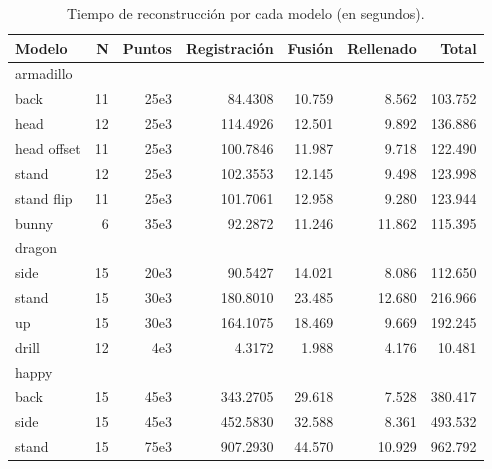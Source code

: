 \begin{table}
	\centering
	\begin{tabular}{l*{6}{r}}
		\toprule
		Modelo                 & N    & Puntos      &  Registración & Fusión   & Rellenado & Total\\
		\midrule                      
		armadillo\\
		{\Em}back         &   11 &  25e3         &   84.4308        & 10.759  &  8.562  & 103.752\\
		{\Em}head         &   12 &  25e3         &   114.4926       & 12.501  &  9.892  & 136.886\\
		{\Em}head offset  &   11 &  25e3         &   100.7846       & 11.987  &  9.718  & 122.490\\
		{\Em}stand        &   12 &  25e3         &   102.3553       & 12.145  &  9.498  & 123.998\\
		{\Em}stand flip   &   11 &  25e3         &   101.7061       & 12.958  &  9.280  & 123.944\\
		\midrule                      
		bunny                  &   6  &  35e3         &    92.2872       & 11.246  &  11.862 & 115.395\\
		\midrule                      
		dragon\\
		{\Em}side            &   15 &  20e3         &   90.5427        & 14.021  &  8.086  & 112.650\\
		{\Em}stand           &   15 &  30e3         &   180.8010       & 23.485  &  12.680 & 216.966\\
		{\Em}up              &   15 &  30e3         &   164.1075       & 18.469  &  9.669  & 192.245\\
		\midrule                      
		drill                  &   12 &   4e3         &   4.3172         & 1.988   &  4.176  & 10.481 \\
		\midrule                      
		happy\\
		{\Em}back             &   15 &  45e3         &   343.2705       & 29.618  &  7.528  & 380.417\\
		{\Em}side             &   15 &  45e3         &   452.5830       & 32.588  &  8.361  & 493.532\\
		{\Em}stand            &   15 &  75e3         &   907.2930       & 44.570  &  10.929 & 962.792\\
		\bottomrule
	\end{tabular}
	\caption[Tiempo de reconstrucción]{\label{tab:reconstr_time}Tiempo de reconstrucción por cada modelo (en segundos).}
\end{table}

